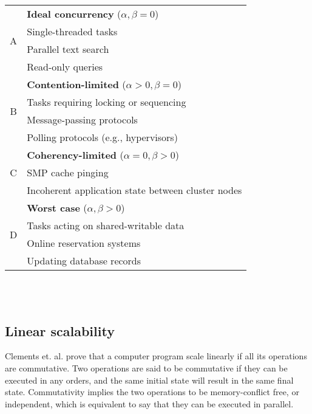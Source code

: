 \begin{tabular}{c|l} \hline

\multirow{4}{*}{A} & \textbf{Ideal concurrency} ($\alpha, \beta = 0$)      \\
                   & Single-threaded tasks                                 \\
                   & Parallel text search                                  \\
                   & Read-only queries                                     \\ \hline
\multirow{4}{*}{B} & \textbf{Contention-limited} ($\alpha > 0, \beta = 0$) \\
                   & Tasks requiring locking or sequencing                 \\
                   & Message-passing protocols                             \\
                   & Polling protocols (e.g., hypervisors)                 \\ \hline
\multirow{3}{*}{C} & \textbf{Coherency-limited} ($\alpha = 0, \beta > 0$)  \\
                   & SMP cache pinging                                     \\
                   & Incoherent application state between cluster nodes    \\ \hline
\multirow{4}{*}{D} & \textbf{Worst case} ($\alpha, \beta > 0$)             \\
                   & Tasks acting on shared-writable data                  \\
                   & Online reservation systems                            \\
                   & Updating database records                             \\ \hline
\end{tabular}
\\~\\











\subsection{Linear scalability}

Clements et. al. \cite{Clements2013a} prove that a computer program scale linearly if all its operations are commutative.
Two operations are said to be commutative if they can be executed in any orders, and the same initial state will result in the same final state.
Commutativity implies the two operations to be memory-conflict free, or independent, which is equivalent to say that they can be executed in parallel.

